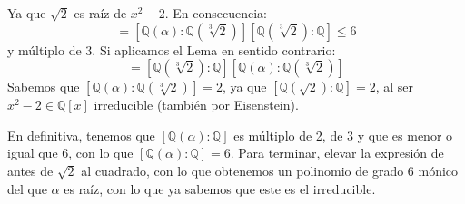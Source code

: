 \begin{ejercicio}
\begin{enumerate}[label=\alph*)]
            Ya que $\sqrt{2}$ es raíz de $x^2-2$. En consecuencia:
            \begin{equation*}
                [\mathbb{Q}(\alpha):\mathbb{Q}] = [\mathbb{Q}(\alpha):\mathbb{Q}(\sqrt[3]{2})][\mathbb{Q}(\sqrt[3]{2}):\mathbb{Q}] \leq 6
            \end{equation*}
            y múltiplo de $3$. Si aplicamos el Lema en sentido contrario:
            \begin{equation*}
                [\mathbb{Q}(\alpha):\mathbb{Q}] = [\mathbb{Q}(\sqrt[3]{2}):\mathbb{Q}][\mathbb{Q}(\alpha):\mathbb{Q}(\sqrt[3]{2})]
            \end{equation*}
            Sabemos que $[\mathbb{Q}(\alpha):\mathbb{Q}(\sqrt[3]{2})]=2$, ya que $[\mathbb{Q}(\sqrt{2}):\mathbb{Q}]=2$, al ser $x^2-2\in \mathbb{Q}[x]$ irreducible (también por Eisenstein).

            En definitiva, tenemos que $[\mathbb{Q}(\alpha):\mathbb{Q}]$ es múltiplo de 2, de 3 y que es menor o igual que 6, con lo que $[\mathbb{Q}(\alpha):\mathbb{Q}] = 6$. Para terminar, elevar la expresión de antes de $\sqrt{2}$ al cuadrado, con lo que obtenemos un polinomio de grado 6 mónico del que $\alpha$ es raíz, con lo que ya sabemos que este es el irreducible.
    \end{enumerate}
\end{ejercicio}

